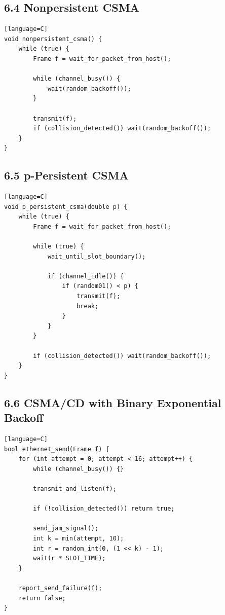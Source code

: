 \documentclass[11pt]{article}
\begin{document}
\subsection{6.4 Nonpersistent CSMA}\label{nonpersistent-csma}

\begin{verbatim}[language=C]
void nonpersistent_csma() {
    while (true) {
        Frame f = wait_for_packet_from_host();

        while (channel_busy()) {
            wait(random_backoff());
        }

        transmit(f);
        if (collision_detected()) wait(random_backoff());
    }
}
\end{verbatim}

\subsection{6.5 p-Persistent CSMA}\label{p-persistent-csma}

\begin{verbatim}[language=C]
void p_persistent_csma(double p) {
    while (true) {
        Frame f = wait_for_packet_from_host();

        while (true) {
            wait_until_slot_boundary();

            if (channel_idle()) {
                if (random01() < p) {
                    transmit(f);
                    break;
                }
            }
        }

        if (collision_detected()) wait(random_backoff());
    }
}
\end{verbatim}

\subsection{6.6 CSMA/CD with Binary Exponential
Backoff}\label{csmacd-with-binary-exponential-backoff}

\begin{verbatim}[language=C]
bool ethernet_send(Frame f) {
    for (int attempt = 0; attempt < 16; attempt++) {
        while (channel_busy()) {}

        transmit_and_listen(f);

        if (!collision_detected()) return true;

        send_jam_signal();
        int k = min(attempt, 10);
        int r = random_int(0, (1 << k) - 1);
        wait(r * SLOT_TIME);
    }

    report_send_failure(f);
    return false;
}
\end{verbatim}
\end{document}
